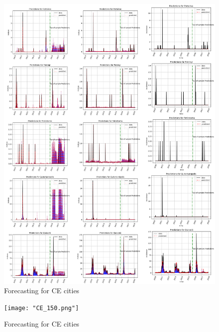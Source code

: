  \begin{figure}[!ht] 
 \centering 
 \includegraphics[width=\textwidth]{"CE_145.png"} 
 \caption{Forecasting for CE cities } 
 \label{fig:CE_145} 
 \end{figure} 
 
 \begin{figure}[!ht] 
 \centering 
 \texttt{[image: "CE\_150.png"]} 
 \caption{Forecasting for CE cities } 
 \label{fig:CE_150} 
 \end{figure} 
 

